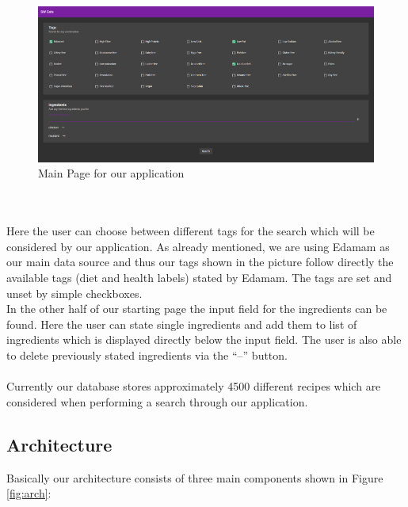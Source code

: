 \documentclass{article}
\begin{document}
\begin{figure}[H]
  \centering
  \includegraphics[width=15cm]{pictures/frontend.png}
  \caption{Main Page for our application}
  \label{fig:front}
\end{figure}
\noindent
\\ \\
Here the user can choose between different tags for the search which will be considered by our application. As already mentioned, we are using Edamam as our main data source and thus our tags shown in the picture follow directly the available tags (diet and health labels) stated by Edamam. The tags are set and unset by simple checkboxes. \\
In the other half of our starting page the input field for the ingredients can be found. Here the user can state single ingredients and add them to list of ingredients which is displayed directly below the input field. The user is also able to delete previously stated ingredients via the ``--'' button. \\ \\
Currently our database stores approximately 4500 different recipes which are considered when performing a search through our application.

\subsection{Architecture}
Basically our architecture consists of three main components shown in Figure \ref{fig:arch}:
\end{document}
